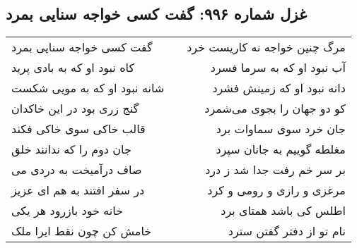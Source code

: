 \begin{center}
\section*{غزل شماره ۹۹۶: گفت کسی خواجه سنایی بمرد}
\label{sec:0996}
\begin{longtable}{l p{0.5cm} r}
گفت کسی خواجه سنایی بمرد
&&
مرگ چنین خواجه نه کاریست خرد
\\
کاه نبود او که به بادی پرید
&&
آب نبود او که به سرما فسرد
\\
شانه نبود او که به مویی شکست
&&
دانه نبود او که زمینش فشرد
\\
گنج زری بود در این خاکدان
&&
کو دو جهان را بجوی می‌شمرد
\\
قالب خاکی سوی خاکی فکند
&&
جان خرد سوی سماوات برد
\\
جان دوم را که ندانند خلق
&&
مغلطه گوییم به جانان سپرد
\\
صاف درآمیخت به دردی می
&&
بر سر خم رفت جدا شد ز درد
\\
در سفر افتند به هم ای عزیز
&&
مرغزی و رازی و رومی و کرد
\\
خانه خود بازرود هر یکی
&&
اطلس کی باشد همتای برد
\\
خامش کن چون نقط ایرا ملک
&&
نام تو از دفتر گفتن سترد
\\
\end{longtable}
\end{center}
